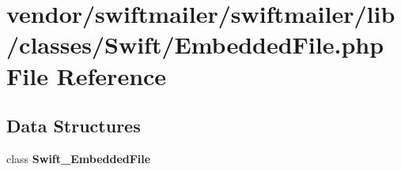 \section{vendor/swiftmailer/swiftmailer/lib/classes/\+Swift/\+Embedded\+File.php File Reference}
\label{_embedded_file_8php}
\subsection*{Data Structures}
\begin{DoxyCompactItemize}
\item 
class {\bf Swift\+\_\+\+Embedded\+File}
\end{DoxyCompactItemize}
